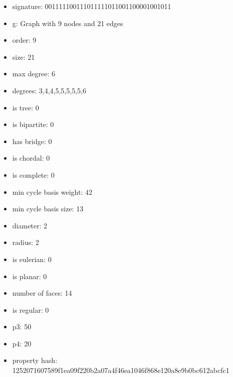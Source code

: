 \newpage
\begin{figure}
\end{figure}
\begin{itemize}
\item signature: 001111100111011111011001100001001011
\item g: Graph with 9 nodes and 21 edges
\item order: 9
\item size: 21
\item max degree: 6
\item degrees: 3,4,4,5,5,5,5,5,6
\item is tree: 0
\item is bipartite: 0
\item has bridge: 0
\item is chordal: 0
\item is complete: 0
\item min cycle basis weight: 42
\item min cycle basis size: 13
\item diameter: 2
\item radius: 2
\item is eulerian: 0
\item is planar: 0
\item number of faces: 14
\item is regular: 0
\item p3: 50
\item p4: 20
\item property hash: 1252071607589f1ea09f220b2a07a4f46ea1046f868e120a8e9b0bc612abcfc1
\end{itemize}
